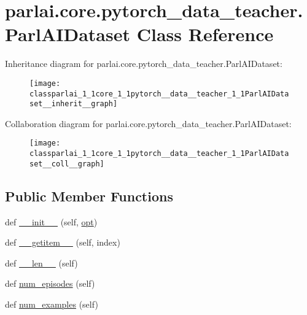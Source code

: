 \hypertarget{classparlai_1_1core_1_1pytorch__data__teacher_1_1ParlAIDataset}{}\section{parlai.\+core.\+pytorch\+\_\+data\+\_\+teacher.\+Parl\+A\+I\+Dataset Class Reference}
\label{classparlai_1_1core_1_1pytorch__data__teacher_1_1ParlAIDataset}


Inheritance diagram for parlai.\+core.\+pytorch\+\_\+data\+\_\+teacher.\+Parl\+A\+I\+Dataset\+:
\nopagebreak
\begin{figure}[H]
\begin{center}
\leavevmode
\texttt{[image: classparlai\_1\_1core\_1\_1pytorch\_\_data\_\_teacher\_1\_1ParlAIDataset\_\_inherit\_\_graph]}
\end{center}
\end{figure}


Collaboration diagram for parlai.\+core.\+pytorch\+\_\+data\+\_\+teacher.\+Parl\+A\+I\+Dataset\+:
\nopagebreak
\begin{figure}[H]
\begin{center}
\leavevmode
\texttt{[image: classparlai\_1\_1core\_1\_1pytorch\_\_data\_\_teacher\_1\_1ParlAIDataset\_\_coll\_\_graph]}
\end{center}
\end{figure}
\subsection*{Public Member Functions}
\begin{DoxyCompactItemize}
\item 
def \hyperlink{classparlai_1_1core_1_1pytorch__data__teacher_1_1ParlAIDataset_ac37c4338b73b65fd101bc926e8692366}{\+\_\+\+\_\+init\+\_\+\+\_\+} (self, \hyperlink{classparlai_1_1core_1_1pytorch__data__teacher_1_1ParlAIDataset_a5bf9f1b261c64e4ab37120ba6ed8b935}{opt})
\item 
def \hyperlink{classparlai_1_1core_1_1pytorch__data__teacher_1_1ParlAIDataset_ab9ea498b7257530c512c30c860452b40}{\+\_\+\+\_\+getitem\+\_\+\+\_\+} (self, index)
\item 
def \hyperlink{classparlai_1_1core_1_1pytorch__data__teacher_1_1ParlAIDataset_aaead6896e0da8032cef53af977359886}{\+\_\+\+\_\+len\+\_\+\+\_\+} (self)
\item 
def \hyperlink{classparlai_1_1core_1_1pytorch__data__teacher_1_1ParlAIDataset_a2b59aeb0c912cbee38cd6cd03f5d58db}{num\+\_\+episodes} (self)
\item 
def \hyperlink{classparlai_1_1core_1_1pytorch__data__teacher_1_1ParlAIDataset_afc5ca19cf94aad64c75e7799686efc7c}{num\+\_\+examples} (self)
\end{DoxyCompactItemize}
